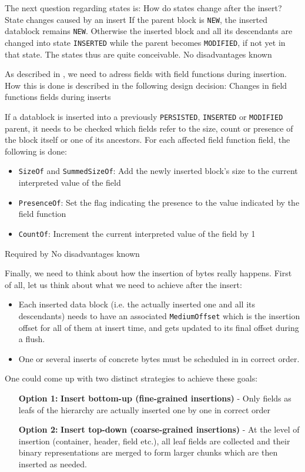 The next question regarding states is: How do states change after the insert?
{%
State changes caused by an insert
}
{%
If the parent block is \texttt{NEW}, the inserted datablock remains \texttt{NEW}. Otherwise the inserted block and all its descendants are changed into state \texttt{INSERTED} while the parent becomes \texttt{MODIFIED}, if not yet in that state.
}
{%
The states thus are quite conceivable.
}
{%
No disadvantages known
}

As described in , we need to adress fields with field functions during insertion. How this is done is described in the following design decision:
{%
Changes in field functions fields during inserts
}
{%
  If a datablock is inserted into a previously \texttt{PERSISTED}, \texttt{INSERTED} or \texttt{MODIFIED} parent, it needs to be checked which fields refer to the size, count or presence of the block itself or one of its ancestors. For each affected field function field, the following is done:
  \begin{itemize}
  \item \texttt{SizeOf} and \texttt{SummedSizeOf}: Add the newly inserted block's size to the current interpreted value of the field
  \item \texttt{PresenceOf}: Set the flag indicating the presence to the value indicated by the field function
  \item \texttt{CountOf}: Increment the current interpreted value of the field by 1
  \end{itemize}
}
{%
Required by 
}
{%
No disadvantages known
}

Finally, we need to think about how the insertion of bytes really happens. First of all, let us think about what we need to achieve after the insert:
\begin{itemize}
\item Each inserted data block (i.e. the actually inserted one and all its descendants) needs to have an associated \texttt{MediumOffset} which is the insertion offset for all of them at insert time, and gets updated to its final offset during a flush.
\item One or several inserts of concrete bytes must be scheduled in \COMPmedia{} in correct order.
\end{itemize}

One could come up with two distinct strategies to achieve these goals:
\begin{enumerate}
\item [\textbf{Option 1:}] \textbf{Insert bottom-up (fine-grained insertions)} - Only fields as leafs of the hierarchy are actually inserted one by one in correct order
\item [\textbf{Option 2:}] \textbf{Insert top-down (coarse-grained insertions)} - At the level of insertion (container, header, field etc.), all leaf fields are collected and their binary representations are merged to form larger chunks which are then inserted as needed.
\end{enumerate}

